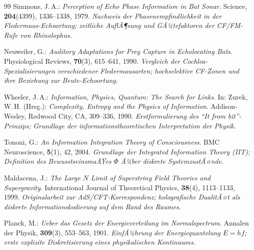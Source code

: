 ﻿\documentclass[12pt,a4paper,titlepage]{report}
\begin{document}
\begin{thebibliography}{99}
Simmons, J.\,A.:
\textit{Perception of Echo Phase Information in Bat Sonar}.
Science, \textbf{204}(4399), 1336--1338, 1979.
\newline\textit{Nachweis der Phasenempfindlichkeit in der Fledermaus-Echoortung;
zeitliche AuflÃ¶sung und GÃ¼tefaktoren der CF/FM-Rufe von \textit{Rhinolophus}.}

Neuweiler, G.:
\textit{Auditory Adaptations for Prey Capture in Echolocating Bats}.
Physiological Reviews, \textbf{70}(3), 615--641, 1990.
\newline\textit{Vergleich der Cochlea-Spezialisierungen verschiedener Fledermausarten;
hochselektive CF-Zonen und ihre Beziehung zur Beute-Echoortung.}

Wheeler, J.\,A.:
\textit{Information, Physics, Quantum: The Search for Links}.
In: Zurek, W.\,H. (Hrsg.): \textit{Complexity, Entropy and the Physics of
Information}. Addison-Wesley, Redwood City, CA, 309--336, 1990.
\newline\textit{Erstformulierung des ``It from bit''-Prinzips; Grundlage der
informationstheoretischen Interpretation der Physik.}

Tononi, G.:
\textit{An Information Integration Theory of Consciousness}.
BMC Neuroscience, \textbf{5}(1), 42, 2004.
\newline\textit{Grundlage der Integrated Information Theory (IIT); Definition
des BewusstseinsmaÃŸes $\Phi$ Ã¼ber diskrete SystemzustÃ¤nde.}

Maldacena, J.:
\textit{The Large $N$ Limit of Superstring Field Theories and Supergravity}.
International Journal of Theoretical Physics, \textbf{38}(4), 1113--1133, 1999.
\newline\textit{Originalarbeit zur AdS/CFT-Korrespondenz; holografische
DualitÃ¤t als diskrete Informationskodierung auf dem Rand des Raumes.}

Planck, M.:
\textit{Ueber das Gesetz der Energieverteilung im Normalspectrum}.
Annalen der Physik, \textbf{309}(3), 553--563, 1901.
\newline\textit{EinfÃ¼hrung der Energiequantelung $E = hf$; erste explizite
Diskretisierung eines physikalischen Kontinuums.}

\end{thebibliography}
\end{document}
